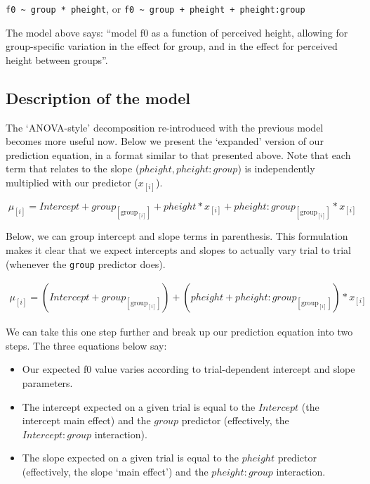 \documentclass[
]{book}
\begin{document}
\texttt{f0\ \textasciitilde{}\ group\ *\ pheight}, or \texttt{f0\ \textasciitilde{}\ group\ +\ pheight\ +\ pheight:group}

The model above says: ``model f0 as a function of perceived height, allowing for group-specific variation in the effect for group, and in the effect for perceived height between groups''.

\hypertarget{description-of-the-model-6}{%
\subsection{Description of the model}\label{description-of-the-model-6}}

The `ANOVA-style' decomposition re-introduced with the previous model becomes more useful now. Below we present the `expanded' version of our prediction equation, in a format similar to that presented above. Note that each term that relates to the slope (\(pheight, pheight \colon group\)) is independently multiplied with our predictor (\(x_{[i]}\)).

\[
\mu_{[i]} = Intercept + group_{[\mathrm{group}_{[i]}]} + pheight * x_{[i]} + pheight \colon group_{[\mathrm{group}_{[i]}]} * x_{[i]}
\label{eq:512}
\]

Below, we can group intercept and slope terms in parenthesis. This formulation makes it clear that we expect intercepts and slopes to actually vary trial to trial (whenever the \texttt{group} predictor does).

\begin{equation}
\begin{split}
\mu_{[i]} = (Intercept + group_{[\mathrm{group}_{[i]}]}) + (pheight + pheight \colon group_{[\mathrm{group}_{[i]}]}) * x_{[i]}
\end{split}
\label{eq:513}
\end{equation}

We can take this one step further and break up our prediction equation into two steps. The three equations below say:

\begin{itemize}
\item
  Our expected f0 value varies according to trial-dependent intercept and slope parameters.
\item
  The intercept expected on a given trial is equal to the \(Intercept\) (the intercept main effect) and the \(group\) predictor (effectively, the \(Intercept:group\) interaction).
\item
  The slope expected on a given trial is equal to the \(pheight\) predictor (effectively, the slope `main effect') and the \(pheight:group\) interaction.
\end{itemize}
\end{document}

